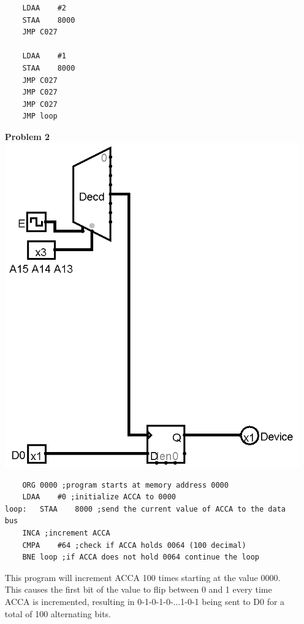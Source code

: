 \documentclass{article}
\begin{document}
\begin{itemize}
\begin{verbatim}
	LDAA	#2
	STAA	8000
	JMP	C027

	LDAA	#1
	STAA	8000
	JMP	C027
	JMP	C027
	JMP	C027
	JMP	loop
\end{verbatim}
	
	\item [\textbf{Problem 2}]\hspace{0pt}\\
	\includegraphics[scale=0.5]{hw8b}
\begin{verbatim}
	ORG	0000 ;program starts at memory address 0000
	LDAA	#0 ;initialize ACCA to 0000
loop:	STAA	8000 ;send the current value of ACCA to the data bus
	INCA ;increment ACCA
	CMPA	#64 ;check if ACCA holds 0064 (100 decimal)
	BNE	loop ;if ACCA does not hold 0064 continue the loop
\end{verbatim}

This program will increment ACCA 100 times starting at the value 0000. This causes the first bit of the value to flip between 0 and 1 every time ACCA is incremented, resulting in 0-1-0-1-0-...1-0-1 being sent to D0 for a total of 100 alternating bits.

\end{itemize}
\end{document}
